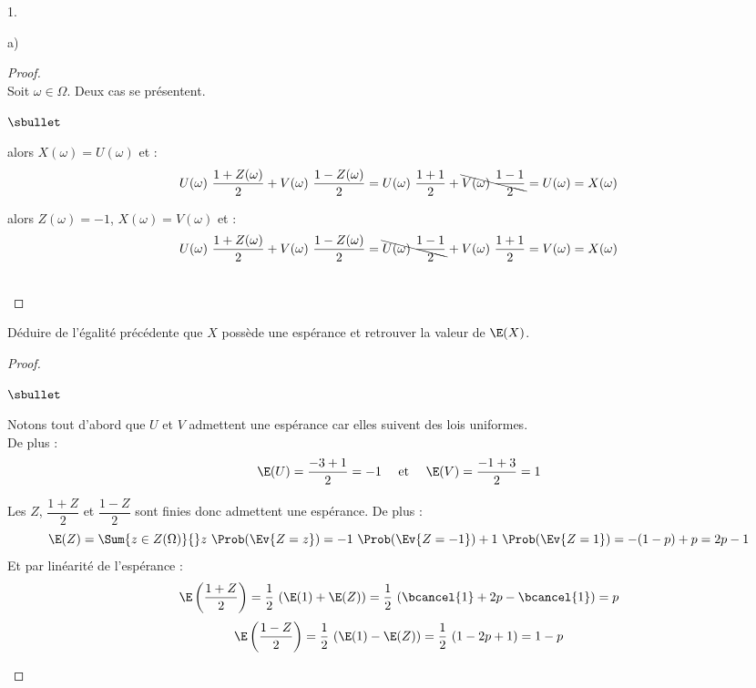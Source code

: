 \documentclass[11pt]{article}%
\begin{document}
\begin{noliste}{1.}
\begin{noliste}{a)}
    \begin{proof}~\\
      Soit $\omega \in \Omega$. Deux cas se présentent.
      \begin{noliste}{$\sbullet$}
      \item {} alors $X(\omega) =
        U(\omega)$ et :
        \[
        U(\omega) \ \dfrac{1+Z(\omega)}{2} + V(\omega) \
        \dfrac{1-Z(\omega)}{2} = U(\omega) \ \dfrac{1+1}{2} +
        \bcancel{V(\omega) \ \dfrac{1-1}{2}} = U(\omega) = X(\omega)
        \]
      \item {} alors $Z(\omega) = -1$,
        $X(\omega) = V(\omega)$ et :
        \[
        U(\omega) \ \dfrac{1+Z(\omega)}{2} + V(\omega) \
        \dfrac{1-Z(\omega)}{2} = \bcancel{U(\omega) \ \dfrac{1-1}{2}}
        + V(\omega) \ \dfrac{1+1}{2} = V(\omega) = X(\omega)
        \]    
      \end{noliste}
      ~\\[-1cm]
    \end{proof}




  \item Déduire de l'égalité précédente que $X$ possède une espérance
    et retrouver la valeur de $\E(X)$.

    \begin{proof}~
      \begin{noliste}{$\sbullet$}
      \item Notons tout d'abord que $U$ et $V$ admettent une espérance
        car elles suivent des lois uniformes. \\
        De plus :
        \[
        \E(U) = \dfrac{-3 + 1}{2} = -1 \quad \text{ et } \quad \E(V) =
        \dfrac{-1 + 3}{2} = 1
        \]
      \item Les \var $Z$, $\dfrac{1+Z}{2}$ et $\dfrac{1-Z}{2}$ sont
        finies donc admettent une espérance. De plus :
        \[
        \E(Z) = \Sum{z \in Z(\Omega)}{} z \ \Prob(\Ev{Z = z}) = -1 \
        \Prob(\Ev{Z = -1}) + 1 \ \Prob(\Ev{Z = 1}) = -(1-p) + p = 2p-1
        \]
        Et par linéarité de l'espérance :
        \[
        \E\left(\dfrac{1+Z}{2}\right) = \dfrac{1}{2} \ (\E(1) + \E(Z)) =
        \dfrac{1}{2} \ (\bcancel{1} + 2p -\bcancel{1}) = p
        \]
        \[
        \E\left(\dfrac{1-Z}{2}\right) = \dfrac{1}{2} \ (\E(1) - \E(Z)) =
        \dfrac{1}{2} \ (1 - 2p + 1) = 1-p
        \]


\end{noliste}
\end{proof}
\end{noliste}
\end{noliste}
\end{document}
